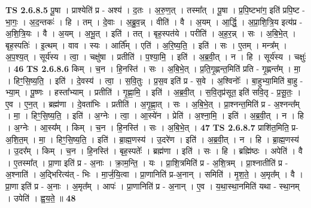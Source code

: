 \documentclass[17pt]{extarticle}
\begin{document}
                  \newline
                                \textbf{ TS 2.6.8.5} \newline
                  पू॒षा । प्राश्येति॑ प्र - अश्य॑ । द॒तः । अ॒रु॒ण॒त् । तस्मा᳚त् । पू॒षा । प्र॒पि॒ष्टभा॑ग॒ इति॑ प्रपि॒ष्ट - भा॒गः॒ । अ॒द॒न्तकः॑ । हि । तम् । दे॒वाः । अ॒ब्रु॒व॒न्न् । वीति॑ । वै । अ॒यम् । आ॒र्द्धि॒ । अ॒प्रा॒शि॒त्रि॒य इत्य॑प्र - अ॒शि॒त्रि॒यः । वै । अ॒यम् । अ॒भू॒त् । इति॑ । तत् । बृह॒स्पत॑ये । परीति॑ । अ॒ह॒र॒न्न् । सः । अ॒बि॒भे॒त् । बृह॒स्पतिः॑ । इ॒त्थम् । वाव । स्यः । आर्ति᳚म् । एति॑ । अ॒रि॒ष्य॒ति॒ । इति॑ । सः । ए॒तम् । मन्त्र᳚म् । अ॒प॒श्य॒त् । सूर्य॑स्य । त्वा॒ । चक्षु॑षा । प्रतीति॑ । प॒श्या॒मि॒ । इति॑ । अ॒ब्र॒वी॒त् । न । हि । सूर्य॑स्य । चक्षुः॑ । \textbf{  46} \newline
                  \newline
                                \textbf{ TS 2.6.8.6} \newline
                  किम् । च॒न । हि॒नस्ति॑ । सः । अ॒बि॒भे॒त् । प्र॒ति॒गृ॒ह्णन्त॒मिति॑ प्रति - गृ॒ह्णन्त᳚म् । मा॒ । हिꣳ॒॒सि॒ष्य॒ति॒ । इति॑ । दे॒वस्य॑ । त्वा॒ । स॒वि॒तुः । प्र॒स॒व इति॑ प्र - स॒वे । अ॒श्विनोः᳚ । बा॒हुभ्या॒मिति॑ बा॒हु - भ्या॒म् । पू॒ष्णः । हस्ता᳚भ्याम् । प्रतीति॑ । गृ॒ह्णा॒मि॒ । इति॑ । अ॒ब्र॒वी॒त् । स॒वि॒तृप्र॑सूत॒ इति॑ सवि॒तृ - प्र॒सू॒तः॒ । ए॒व । ए॒न॒त् । ब्रह्म॑णा । दे॒वता॑भिः । प्रतीति॑ । अ॒गृ॒ह्णा॒त् । सः । अ॒बि॒भे॒त् । प्रा॒श्नन्त॒मिति॑ प्र - अ॒श्नन्त᳚म् । मा॒ । हिꣳ॒॒सि॒ष्य॒ति॒ । इति॑ । अ॒ग्नेः । त्वा॒ । आ॒स्ये॑न । प्रेति॑ । अ॒श्ना॒मि॒ । इति॑ । अ॒ब्र॒वी॒त् । न । हि । अ॒ग्नेः । आ॒स्य᳚म् । किम् । च॒न । हि॒नस्ति॑ । सः । अ॒बि॒भे॒त् । \textbf{  47} \newline
                  \newline
                                \textbf{ TS 2.6.8.7} \newline
                  प्राशि॑त॒मिति॒ प्र-अ॒शि॒त॒म् । मा॒ । हिꣳ॒॒सि॒ष्य॒ति॒ । इति॑ । ब्रा॒ह्म॒णस्य॑ । उ॒दरे॑ण । इति॑ । अ॒ब्र॒वी॒त् । न । हि । ब्रा॒ह्म॒णस्य॑ । उ॒दर᳚म् । किम् । च॒न । हि॒नस्ति॑ । बृह॒स्पतेः᳚ । ब्रह्म॑णा । इति॑ । सः । हि । ब्रह्मि॑ष्ठः । अपेति॑ । वै । ए॒तस्मा᳚त् । प्रा॒णा इति॑ प्र - अ॒नाः । क्रा॒म॒न्ति॒ । यः । प्रा॒शि॒त्रमिति॑ प्र - अ॒शि॒त्रम् । प्रा॒श्नातीति॑ प्र - अ॒श्नाति॑ । अ॒द्भिरित्य॑त् - भिः । मा॒र्ज॒यि॒त्वा । प्रा॒णानिति॑ प्र-अ॒नान् । समिति॑ । मृ॒श॒ते॒ । अ॒मृत᳚म् । वै । प्रा॒णा इति॑ प्र - अ॒नाः । अ॒मृत᳚म् । आपः॑ । प्रा॒णानिति॑ प्र - अ॒नान् । ए॒व । य॒था॒स्था॒नमिति॑ यथा - स्था॒नम् । उपेति॑ । ह्व॒य॒ते॒ ॥ \textbf{  48} \newline
                  \newline
\end{document}
